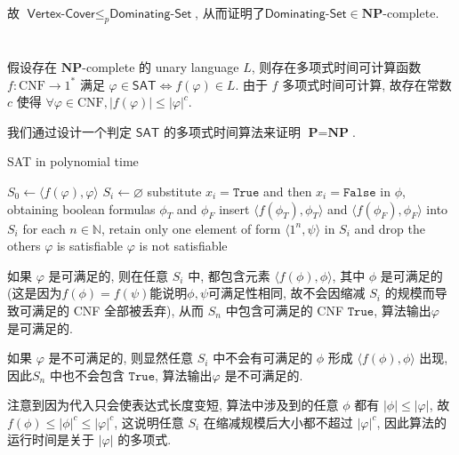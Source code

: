 \documentclass[8pt]{article}
\theoremstyle{compact}
\def\le{\leqslant}
\begin{document}
故 $\textsf{Vertex-Cover} \le_p \textsf{Dominating-Set}$, 从而证明了$\textsf{Dominating-Set} \in \mathbf{NP}$-complete.

\section{}
假设存在 $\mathbf{NP}$-complete 的 unary language $L$, 则存在多项式时间可计算函数 $f: \text{CNF} \to 1^*$ 满足 $\varphi \in \textsf{SAT} \Leftrightarrow f(\varphi) \in L$. 由于 $f$ 多项式时间可计算, 故存在常数 $c$ 使得 $\forall \varphi \in \text{CNF}, |f(\varphi)| \le |\varphi|^c$.

我们通过设计一个判定 $\textsf{SAT}$ 的多项式时间算法来证明 $\textbf{P} = \textbf{NP}$.

\begin{algorithm}
	\caption{\textsf{SAT} in polynomial time}
	\begin{algorithmic}[1]
		\State $S_0 \gets \langle f(\varphi), \varphi \rangle$
			\State $S_i \gets \varnothing$
				\State substitute $x_i = \texttt{True}$ and then $x_i = \texttt{False}$ in $\phi$, obtaining boolean formulas $\phi_{T}$ and $\phi_{F}$
				\State insert $\langle f(\phi_T), \phi_T \rangle$ and $\langle f(\phi_F), \phi_F \rangle$ into $S_i$
			\EndFor
			\State for each $n \in \mathbb N$, retain only one element of form $\langle 1^n, \psi \rangle$ in $S_i$ and drop the others
		\EndFor
			\State \Return $\varphi$ is satisfiable
		\Else
			\State \Return $\varphi$ is not satisfiable
		\EndIf
	\end{algorithmic}
\end{algorithm}

如果 $\varphi$ 是可满足的, 则在任意 $S_i$ 中, 都包含元素 $\langle f(\phi), \phi \rangle$, 其中 $\phi$ 是可满足的(这是因为$f(\phi) = f(\psi)$能说明$\phi, \psi$可满足性相同, 故不会因缩减 $S_i$ 的规模而导致可满足的 CNF 全部被丢弃), 从而 $S_n$ 中包含可满足的 CNF $\texttt{True}$, 算法输出$\varphi$ 是可满足的. 

如果 $\varphi$ 是不可满足的, 则显然任意 $S_i$ 中不会有可满足的 $\phi$ 形成 $\langle f(\phi), \phi \rangle$ 出现, 因此$S_n$ 中也不会包含 $\texttt{True}$, 算法输出$\varphi$ 是不可满足的. 

注意到因为代入只会使表达式长度变短, 算法中涉及到的任意 $\phi$ 都有 $|\phi| \le |\varphi|$, 故 $f(\phi) \le |\phi|^c \le |\varphi|^c$, 这说明任意 $S_i$ 在缩减规模后大小都不超过 $|\varphi|^c$, 因此算法的运行时间是关于 $|\varphi|$ 的多项式.
\end{document}

